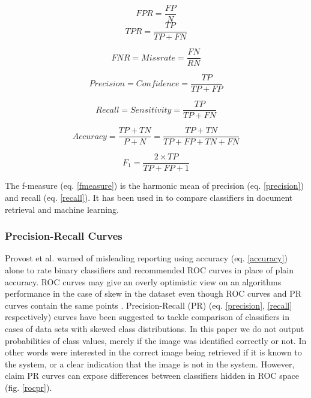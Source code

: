 \documentclass[english,12pt,a4paper,pdftex,elec,utf8, table]{aaltothesis}
\begin{document}
\begin{equation}\label{FPR}
FPR = \frac{FP}{N}
\end{equation}
\begin{equation}\label{TPR}
TPR = \frac{TP}{TP + FN}
\end{equation}

\begin{equation}\label{FNR}
FNR = Miss rate = \frac{FN}{RN}
\end{equation}

\begin{equation}\label{precision}
Precision = Confidence = \frac{TP}{TP + FP}
\end{equation}

\begin{equation}\label{recall}
Recall = Sensitivity = \frac{TP}{TP + FN}
\end{equation}

\begin{equation}\label{accuracy}
Accuracy = \frac{TP + TN}{P + N} = \frac{TP +TN}{TP + FP + TN + FN}
\end{equation}

\begin{equation}\label{fmeasure}
F_1 = \frac{2 \times TP}{TP + FP + 1}
\end{equation}

The f-measure (eq. \ref{fmeasure}) is the harmonic mean of precision (eq. \ref{precision}) and recall (eq. \ref{recall}). It has been used in to compare classifiers in document retrieval and machine learning.

\subsubsection{Precision-Recall Curves}\label{PRSection}
Provost et al. warned of misleading reporting using accuracy (eq. \ref{accuracy}) alone to rate binary classifiers \cite{Provost1997} and recommended ROC curves in place of plain accuracy. ROC curves may give an overly optimistic view on an algorithms performance in the case of skew in the dataset even though ROC curves and PR curves contain the same points \cite{Davis2006}. Precision-Recall (PR) (eq. \ref{precision}, \ref{recall} respectively) curves have been suggested \cite{craven2005markov} to tackle comparison of classifiers in cases of data sets with skewed class distributions. In this paper we do not output probabilities of class values, merely if the image was identified correctly or not. In other words were interested in the correct image being retrieved if it is known to the system, or a clear indication that the image is not in the system. However, \cite{Davis2006} claim PR curves can expose differences between classifiers hidden in ROC space (fig. \ref{rocpr}).
\end{document}
